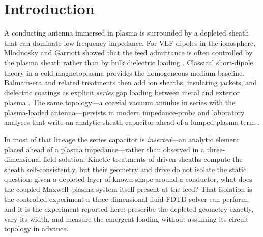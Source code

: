 \documentclass[draft]{agujournal2025}
\begin{document}
\begin{abstract}
\begin{plainlanguagesummary}
Radio antennas in space plasmas sit inside a thin empty sheath next to the metal. We simulated that empty layer as a jacket of controlled thickness around a dipole in a 3-D plasma wave code. Because the jacket wraps the wire, current has to jump the empty gap to reach the plasma; that is a series capacitor, not a capacitor across the antenna terminals. In a band below the plasma frequency, thicker jackets made the antenna look more capacitive for every thickness we ran. Near the plasma frequency the picture changes because the jacket also removes plasma near the wire. An analytic coax formula written for a dipole (not a monopole) matches the simulated capacitance to about twenty percent in a low-frequency window, but the full impedance is not a fixed plasma load plus a pure capacitor.
\end{plainlanguagesummary}
\end{abstract}

\section{Introduction}

A conducting antenna immersed in plasma is surrounded by a depleted sheath that can dominate low-frequency impedance. For VLF dipoles in the ionosphere, Mlodnosky and Garriott showed that the feed admittance is often controlled by the plasma sheath rather than by bulk dielectric loading \cite{mlodnosky1962}. Classical short-dipole theory in a cold magnetoplasma \cite{balmain1964,balmain1969} provides the homogeneous-medium baseline. Balmain-era and related treatments then add ion sheaths, insulating jackets, and dielectric coatings as explicit \emph{series} gap loading between metal and exterior plasma \cite{galejs1966,adachi1977}. The same topology---a coaxial vacuum annulus in series with the plasma-loaded antenna---persists in modern impedance-probe and laboratory analyses that write an analytic sheath capacitor ahead of a lumped plasma term \cite{brooks2024}.

In most of that lineage the series capacitor is \emph{inserted}---an analytic element placed ahead of a plasma impedance---rather than observed in a three-dimensional field solution. Kinetic treatments of driven sheaths \cite{song2007,tu2008} compute the sheath self-consistently, but their geometry and drive do not isolate the static question: given a depleted layer of known shape around a conductor, what does the coupled Maxwell--plasma system itself present at the feed? That isolation is the controlled experiment a three-dimensional fluid FDTD solver \cite{ward2006} can perform, and it is the experiment reported here: prescribe the depleted geometry exactly, vary its width, and measure the emergent loading without assuming its circuit topology in advance.
\end{document}
